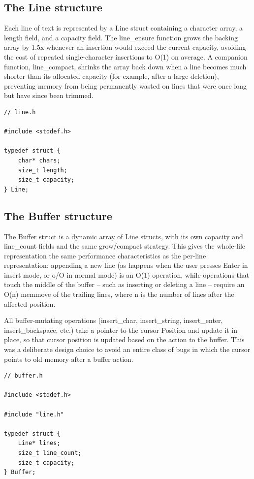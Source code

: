 \documentclass[journal]{IEEEtran}
\begin{document}
\subsection{The Line structure}
Each line of text is represented by a Line struct containing a character array, a length field, and a capacity field. The line\_ensure function grows the backing array by 1.5x whenever an insertion would exceed the current capacity, avoiding the cost of repeated single-character insertions to O(1) on average. A companion function, line\_compact, shrinks the array back down when a line becomes much shorter than its allocated capacity (for example, after a large deletion), preventing memory from being permanently wasted on lines that were once long but have since been trimmed.

\begin{verbatim}
// line.h

#include <stddef.h>

typedef struct {
    char* chars;
    size_t length;
    size_t capacity;
} Line;
\end{verbatim}

\subsection{The Buffer structure}
The Buffer struct is a dynamic array of Line structs, with its own capacity and line\_count fields and the same grow/compact strategy. This gives the whole-file representation the same performance characteristics as the per-line representation: appending a new line (as happens when the user presses Enter in insert mode, or o/O in normal mode) is an O(1) operation, while operations that touch the middle of the buffer -- such as inserting or deleting a line -- require an O(n) memmove of the trailing lines, where n is the number of lines after the affected position.

All buffer-mutating operations (insert\_char, insert\_string, insert\_enter, insert\_backspace, etc.) take a pointer to the cursor Position and update it in place, so that cursor position is updated based on the action to the buffer. This was a deliberate design choice to avoid an entire class of bugs in which the cursor points to old memory after a buffer action.

\begin{verbatim}
// buffer.h

#include <stddef.h>

#include "line.h"

typedef struct {
    Line* lines;
    size_t line_count;
    size_t capacity;
} Buffer;
\end{verbatim}
\end{document}
